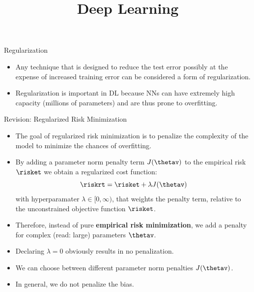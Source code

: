 




\newcommand{\titlefigure}{figure/regu_pic.png}
\newcommand{\learninggoals}{
  \item Regularized cost functions
  \item Norm penalties
  \item Weight decay
  \item Equivalence with constrained optimization
}

\title{Deep Learning}
\date{}




\begin{frame} {Regularization}
\begin{itemize}
\item Any technique that is designed to reduce the test error possibly at the expense of increased training error can be considered a form of regularization.
\item Regularization is important in DL because NNs can have extremely high capacity (millions of parameters) and are thus prone to overfitting.
\end{itemize}
\end{frame}

\begin{vbframe}{Revision: Regularized Risk Minimization}
\begin{itemize}
\item The goal of regularized risk minimization is to penalize the complexity of the model to minimize the chances of overfitting.
\item By adding a parameter norm penalty term \(J(\thetav)\) to the empirical risk $\risket$ we obtain a regularized cost function:
$$\riskrt = \risket + \lambda \text{\(J(\thetav)\)}$$
with hyperparamater $\lambda \in [0, \infty)$, that weights the penalty term, relative to the unconstrained objective function $\risket$.
\item Therefore, instead of pure \textbf{empirical risk minimization}, we add a penalty
for complex (read: large) parameters \(\thetav\).
\item Declaring $\lambda = 0$ obviously results in no penalization.
\item We can choose between different parameter norm penalties \(J(\thetav)\).
\item In general, we do not penalize the bias.
\end{itemize}
\end{vbframe}

